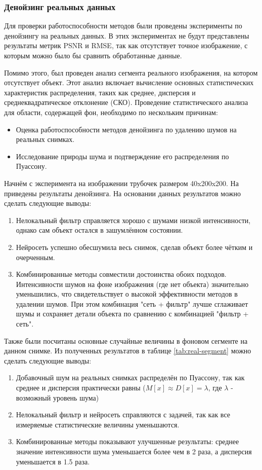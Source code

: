\subsubsection{Денойзинг реальных данных}
\par Для проверки работоспособности методов были проведены эксперименты по денойзингу на реальных данных. В этих экспериментах не будут представлены результаты метрик PSNR и RMSE, так как отсутствует точное изображение, с которым можно было бы сравнить обработанные данные.
\par  Помимо этого, был проведен анализ сегмента реального изображения, на котором отсутствует объект. Этот анализ включает вычисление основных статистических характеристик распределения, таких как среднее, дисперсия и среднеквадратическое отклонение (СКО). Проведение статистического анализа для области, содержащей фон, необходимо по нескольким причинам:
\begin{itemize}[]
	\item Оценка работоспособности методов денойзинга по удалению шумов на реальных снимках.
	\item Исследование природы шума и подтверждение его распределения по Пуассону.
\end{itemize}
\par Начнём с эксперимента на изображении трубочек размером 40x200x200. На  приведены результаты денойзинга. На основании данных результатов можно сделать следующие выводы:
\begin{enumerate}[]
	\item Нелокальный фильтр справляется хорошо с шумами низкой интенсивности, однако сам объект остался в зашумлённом состоянии.
	\item Нейросеть успешно обесшумила весь снимок, сделав объект более чётким и очерченным.
	\item Комбинированные методы совместили достоинства обоих подходов. Интенсивности шумов на фоне изображения (где нет объекта) значительно уменьшились, что свидетельствует о высокой эффективности методов в удалении шумов. При этом комбинация "сеть + фильтр" лучше сглаживает шумы и сохраняет детали объекта по сравнению с комбинацией "фильтр + сеть".
\end{enumerate}
\par Также были посчитаны основные случайные величины в фоновом сегменте на данном снимке. Из полученных результатов в таблице  \ref{tab:real-segment} можно сделать следующие выводы:
\begin{enumerate}[]
	\item Добавочный шум на реальных снимках распределён по Пуассону, так как среднее и дисперсия практически  равны ($M[x] \approx D[x] = \lambda$, где $\lambda$ - возможный уровень шума)
	\item Нелокальный фильтр и нейросеть справляются с задачей, так как все измеряемые статистические величины уменьшаются.
	\item Комбинированные методы показывают улучшенные результаты: среднее значение интенсивности шума уменьшается более чем в 2 раза, а дисперсия уменьшается в 1.5 раза.
\end{enumerate}

